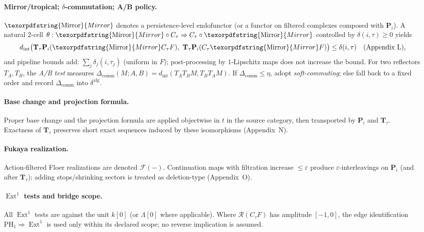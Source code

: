 \documentclass[11pt]{article}
\DeclareMathOperator{\Ext}{Ext}
\DeclareRobustCommand{\hyp}{\nobreakdash-}
\numberwithin{equation}{section}
\theoremstyle{definition}
\DeclareRobustCommand{\Mirror}{\texorpdfstring{\ensuremath{\operatorname{Mirror}}}{Mirror}}
\begin{document}
\paragraph{Mirror/tropical; \(\delta\)\hyp commutation; A/B policy.}
\(\Mirror\) denotes a persistence\hyp level endofunctor (or a functor on filtered complexes composed with \(\mathbf{P}_i\)).
A natural \(2\)\hyp cell \(\theta:\Mirror\circ C_\tau \Rightarrow C_\tau\circ \Mirror\) controlled by \(\delta(i,\tau)\ge0\) yields
\[
d_{\mathrm{int}}\big(\mathbf{T}_\tau\mathbf{P}_i(\Mirror C_\tau F),\ \mathbf{T}_\tau\mathbf{P}_i(C_\tau\Mirror F)\big)\le \delta(i,\tau)\quad\text{(Appendix~L),}
\]
and pipeline bounds add: \(\sum_j\delta_j(i,\tau_j)\) (uniform in \(F\)); post\hyp processing by \(1\)\hyp Lipschitz maps does not increase the bound.
For two reflectors \(T_A,T_B\), the \emph{A/B test} measures
\(\Delta_{\mathrm{comm}}(M;A,B)=d_{\mathrm{int}}(T_AT_BM,T_BT_AM)\).
If \(\Delta_{\mathrm{comm}}\le \eta\), adopt \emph{soft\hyp commuting}; else fall back to a fixed order and record \(\Delta_{\mathrm{comm}}\) into \(\delta^{\mathrm{alg}}\).

\paragraph{Base change and projection formula.}
Proper base change and the projection formula are applied objectwise in \(t\) in the source category, then transported by \(\mathbf{P}_i\) and \(\mathbf{T}_\tau\).
Exactness of \(\mathbf{T}_\tau\) preserves short exact sequences induced by these isomorphisms (Appendix~N).

\paragraph{Fukaya realization.}
Action\hyp filtered Floer realizations are denoted \(\mathcal{F}(-)\).
Continuation maps with filtration increase \(\le\varepsilon\) produce \(\varepsilon\)\hyp interleavings on \(\mathbf{P}_i\) (and after \(\mathbf{T}_\tau\)); adding stops/shrinking sectors is treated as deletion\hyp type (Appendix~O).

\paragraph{\(\Ext^1\) tests and bridge scope.}
All \(\Ext^1\) tests are against the unit \(k[0]\) (or \(\Lambda[0]\) where applicable).
Where \(\mathcal{R}(C_\tau F)\) has amplitude \([-1,0]\), the edge identification \(\mathrm{PH}_1\Rightarrow\Ext^1\) is used only within its declared scope; no reverse implication is assumed.
\end{document}
